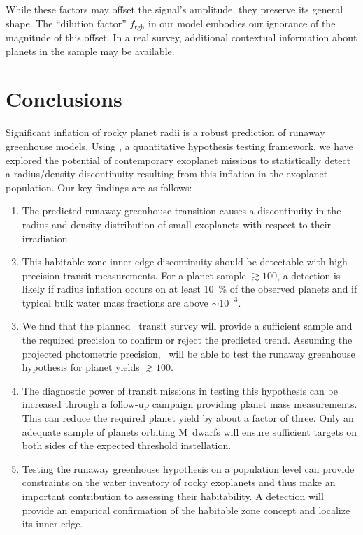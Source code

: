 \documentclass[twocolumn,twocolappendix,linenumbers]{aastex631}
\begin{document}
While these factors may offset the signal's amplitude, they preserve its general shape.
The ``dilution factor'' $f_\mathrm{rgh}$ in our model embodies our ignorance of the magnitude of this offset.
In a real survey, additional contextual information about planets in the sample may be available.


\section{Conclusions}\label{sec:conclusions}
Significant inflation of rocky planet radii is a robust prediction of runaway greenhouse models.
Using \bioverse, a quantitative hypothesis testing framework, we have explored the potential of contemporary exoplanet missions to statistically detect a radius/density discontinuity resulting from this inflation in the exoplanet population.
Our key findings are as follows:
\begin{enumerate}
    \item The predicted runaway greenhouse transition causes a discontinuity in the radius and density distribution of small exoplanets with respect to their irradiation.
    \item This habitable zone inner edge discontinuity should be detectable with high-precision transit measurements.
          For a planet sample $\gtrsim 100$, a detection is likely if radius inflation occurs on at least \SI{10}{\percent} of the observed planets and if typical bulk water mass fractions are above $\sim 10^{-3}$.
    \item We find that the planned \plato\ transit survey will provide a sufficient sample and the required precision to confirm or reject the predicted trend.
          Assuming the projected photometric precision, \plato\ will be able to test the runaway greenhouse hypothesis for planet yields $\gtrsim 100$.
    \item The diagnostic power of transit missions in testing this hypothesis can be increased through a follow-up campaign providing planet mass measurements.
          This can reduce the required planet yield by about a factor of three.
          Only an adequate sample of planets orbiting M~dwarfs will ensure sufficient targets on both sides of the expected threshold instellation.
    \item Testing the runaway greenhouse hypothesis on a population level can provide constraints on the water inventory of rocky exoplanets and thus make an important contribution to assessing their habitability.
         A detection will provide an empirical confirmation of the habitable zone concept and localize its inner edge.

\end{enumerate}
\end{document}
